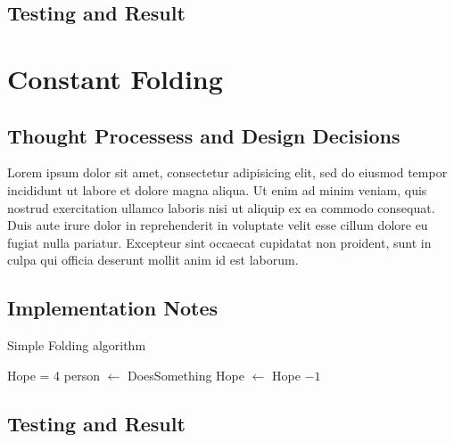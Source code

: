 \documentclass[11pt]{article}
\begin{document}
\subsection{Testing and Result}

\section{Constant Folding}
\subsection{Thought Processess and Design Decisions}

Lorem ipsum dolor sit amet, consectetur adipisicing elit, sed do eiusmod tempor incididunt ut labore et dolore magna aliqua. Ut enim ad minim veniam, quis nostrud exercitation ullamco laboris nisi ut aliquip ex ea commodo consequat. Duis aute irure dolor in reprehenderit in voluptate velit esse cillum dolore eu fugiat nulla pariatur. Excepteur sint occaecat cupidatat non proident, sunt in culpa qui officia deserunt mollit anim id est laborum.

\subsection{Implementation Notes}
\begin{algorithm}[H]
\caption{Simple Folding algorithm}
\begin{algorithmic}[1]
  \State Hope = 4
  \State person $\gets$ DoesSomething
  \Else
  \State Hope $\gets$ Hope $-1$
  \EndIf
  \EndWhile
\end{algorithmic}
\end{algorithm}

\subsection{Testing and Result}
\end{document}
